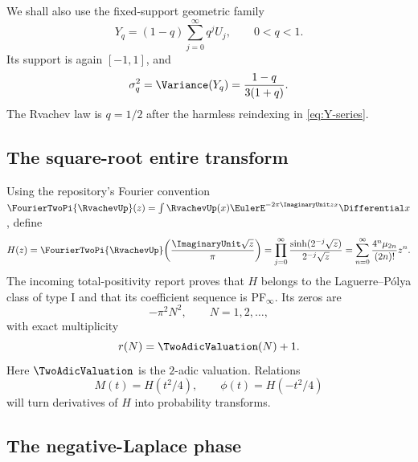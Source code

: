 \documentclass[11pt,oneside]{article}
\theoremstyle{definition}
\theoremstyle{remark}
\begin{document}
We shall also use the fixed-support geometric family
\begin{equation}
 Y_q=(1-q)\sum_{j=0}^{\infty}q^jU_j,
 \qquad 0<q<1.                                      \label{eq:Yq}
\end{equation}
Its support is again $[-1,1]$, and
\begin{equation}
 \sigma_q^2=\Variance(Y_q)=\frac{1-q}{3(1+q)}.            \label{eq:q-variance}
\end{equation}
The Rvachev law is $q=1/2$ after the harmless reindexing in
\eqref{eq:Y-series}.

\subsection{The square-root entire transform}

Using the repository's Fourier convention
\(
 \FourierTwoPi{\RvachevUp}(z)=\int\RvachevUp(x)\EulerE^{-2\pi\ImaginaryUnit zx}\Differential x
\), define
\begin{equation}
 H(z)=\FourierTwoPi{\RvachevUp}\!\left(\frac{\ImaginaryUnit\sqrt z}{\pi}\right)
 =\prod_{j=0}^{\infty}
   \frac{\sinh(2^{-j}\sqrt z)}{2^{-j}\sqrt z}
 =\sum_{n=0}^{\infty}\frac{4^n\mu_{2n}}{(2n)!}z^n.  \label{eq:H-def}
\end{equation}
The incoming total-positivity report proves that $H$ belongs to the
Laguerre--P\'olya class of type I and that its coefficient sequence is
PF$_\infty$.  Its zeros are
\begin{equation}
 -\pi^2N^2,
 \qquad N=1,2,\ldots,                               \label{eq:H-zeros}
\end{equation}
with exact multiplicity
\begin{equation}
 r(N)=\TwoAdicValuation(N)+1.                                   \label{eq:rN}
\end{equation}
Here $\TwoAdicValuation$ is the $2$-adic valuation.  Relations
\begin{equation}
 M(t)=H(t^2/4),
 \qquad \phi(t)=H(-t^2/4)                           \label{eq:H-M-phi}
\end{equation}
will turn derivatives of $H$ into probability transforms.

\subsection{The negative-Laplace phase}
\label{subsec:negative-laplace}
\end{document}
